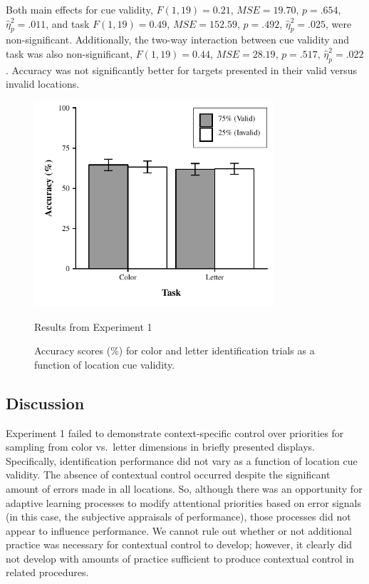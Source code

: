 \documentclass[]{DissertateCUNY}
\begin{document}
Both main effects for cue validity, \(F(1, 19) = 0.21\),
\(\mathit{MSE} = 19.70\), \(p = .654\), \(\hat{\eta}^2_p = .011\), and
task \(F(1, 19) = 0.49\), \(\mathit{MSE} = 152.59\), \(p = .492\),
\(\hat{\eta}^2_p = .025\), were non-significant. Additionally, the
two-way interaction between cue validity and task was also
non-significant, \(F(1, 19) = 0.44\), \(\mathit{MSE} = 28.19\),
\(p = .517\), \(\hat{\eta}^2_p = .022\). Accuracy was not significantly
better for targets presented in their valid versus invalid locations.

\begin{figure}
  \centering
  \includegraphics[height=3in]{figures/ICfigure2.pdf}
  \caption{Results from Experiment 1}
  \caption*{Accuracy scores (\%) for color and letter identification trials as a function of location cue validity.}
  \label{IC_figure2}
\end{figure}

\hypertarget{discussion}{%
\subsection{Discussion}\label{discussion}}

Experiment 1 failed to demonstrate context-specific control over
priorities for sampling from color vs.~letter dimensions in briefly
presented displays. Specifically, identification performance did not
vary as a function of location cue validity. The absence of contextual
control occurred despite the significant amount of errors made in all
locations. So, although there was an opportunity for adaptive learning
processes to modify attentional priorities based on error signals (in
this case, the subjective appraisals of performance), those processes
did not appear to influence performance. We cannot rule out whether or
not additional practice was necessary for contextual control to develop;
however, it clearly did not develop with amounts of practice sufficient
to produce contextual control in related procedures.
\end{document}
